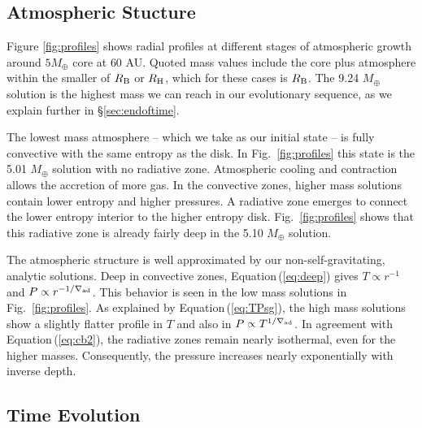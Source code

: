\documentclass[apj, numberedappendix]{emulateapj}
\newcommand{\Eq}[1]{Equation\,(\ref{#1})}
\newcommand{\Fig}[1]{Fig.~\ref{#1}}
\newcommand{\delad}{\nabla_{\rm ad}}
\newcommand{\RB}{R_{\rm B}}
\newcommand{\RH}{R_{\rm H}}
\begin{document}
\subsection{Atmospheric Stucture}
\label{sec:profiles}
Figure \ref{fig:profiles} shows radial profiles at different stages of atmospheric growth around $5 M_{\oplus}$ core at $60$ AU.  Quoted mass values include the core plus atmosphere within the smaller of $\RB$ or $\RH$, which for these cases is $\RB$.  The 9.24 $M_{\oplus}$ solution is the highest mass we can reach in our evolutionary sequence, as we explain further in \S\ref{sec:endoftime}.

The lowest mass atmosphere -- which we take as our initial state -- is fully convective with the same entropy as the disk.  In \Fig{fig:profiles} this state is the 5.01 $M_{\oplus}$ solution with no radiative zone.  Atmospheric cooling and contraction allows the accretion of more gas.  In the convective zones, higher mass solutions contain lower entropy and higher pressures.  A radiative zone emerges to connect the lower entropy interior to the higher entropy disk.  \Fig{fig:profiles} shows that this radiative zone is already fairly deep in the 5.10 $M_\oplus$ solution. 
 
The atmospheric structure is well approximated by our non-self-gravitating, analytic solutions.  Deep in convective zones, \Eq{eq:deep} gives $T \propto r^{-1}$ and $P\propto r^{-1/\delad}$.  This behavior is seen in the low mass solutions in \Fig{fig:profiles}.  As explained by \Eq{eq:TPsg}, the high mass solutions show a slightly flatter profile in $T$ and also in $P \propto T^{1/\delad}$.  In agreement with \Eq{eq:cb2}, the radiative zones remain nearly isothermal, even for the higher masses.  Consequently, the pressure increases nearly exponentially with inverse depth.  


\subsection{Time Evolution}\label{sec:timeev}
\end{document}
